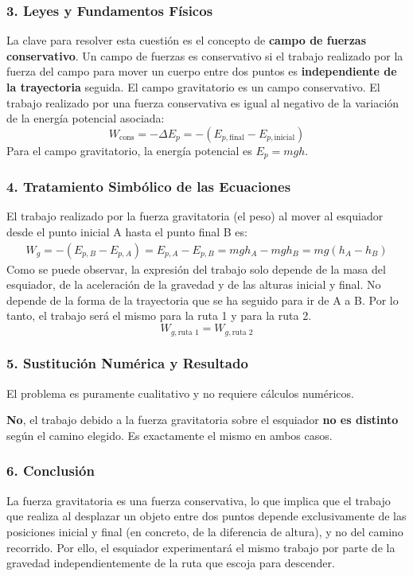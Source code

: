 \subsubsection*{3. Leyes y Fundamentos Físicos}
La clave para resolver esta cuestión es el concepto de \textbf{campo de fuerzas conservativo}. Un campo de fuerzas es conservativo si el trabajo realizado por la fuerza del campo para mover un cuerpo entre dos puntos es \textbf{independiente de la trayectoria} seguida.
El campo gravitatorio es un campo conservativo.
El trabajo realizado por una fuerza conservativa es igual al negativo de la variación de la energía potencial asociada:
$$ W_{\text{cons}} = -\Delta E_p = -(E_{p, \text{final}} - E_{p, \text{inicial}}) $$
Para el campo gravitatorio, la energía potencial es $E_p = mgh$.

\subsubsection*{4. Tratamiento Simbólico de las Ecuaciones}
El trabajo realizado por la fuerza gravitatoria (el peso) al mover al esquiador desde el punto inicial A hasta el punto final B es:
\begin{gather}
    W_g = -(E_{p,B} - E_{p,A}) = E_{p,A} - E_{p,B} = mgh_A - mgh_B = mg(h_A - h_B)
\end{gather}
Como se puede observar, la expresión del trabajo solo depende de la masa del esquiador, de la aceleración de la gravedad y de las alturas inicial y final. No depende de la forma de la trayectoria que se ha seguido para ir de A a B.
Por lo tanto, el trabajo será el mismo para la ruta 1 y para la ruta 2.
$$ W_{g, \text{ruta 1}} = W_{g, \text{ruta 2}} $$

\subsubsection*{5. Sustitución Numérica y Resultado}
El problema es puramente cualitativo y no requiere cálculos numéricos.
\begin{cajaresultado}
\textbf{No}, el trabajo debido a la fuerza gravitatoria sobre el esquiador \textbf{no es distinto} según el camino elegido. Es exactamente el mismo en ambos casos.
\end{cajaresultado}

\subsubsection*{6. Conclusión}
\begin{cajaconclusion}
La fuerza gravitatoria es una fuerza conservativa, lo que implica que el trabajo que realiza al desplazar un objeto entre dos puntos depende exclusivamente de las posiciones inicial y final (en concreto, de la diferencia de altura), y no del camino recorrido. Por ello, el esquiador experimentará el mismo trabajo por parte de la gravedad independientemente de la ruta que escoja para descender.
\end{cajaconclusion}
\newpage

